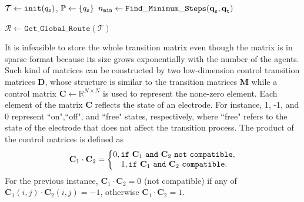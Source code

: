 \documentclass[conference, onecolumn]{IEEEtran}
\begin{document}
\begin{algorithm}[ht!]
	\caption {${{\tt GRTM}}$}
	\label{globalroute}
	\DontPrintSemicolon
	\SetAlgoVlined
	\BlankLine	
	$\mathcal{T}  \gets \mathtt{init}(q_{\tt s}) $,	$\mathbb{P}  \gets \{q_{\tt s}\} $\;
	$n_{\tt min} \gets \mathtt{Find\_Minimum\_Steps}(\textbf{q}_{\tt s},\textbf{q}_{\tt t}) $\;	
	
	$\mathcal{R} \gets \mathtt{Get\_Global\_Route}(\mathcal{T})$	
\end{algorithm}



It is infeasible to store the whole transition matrix even though the matrix is in sparse format because its size grows exponentially with the number of the agents. Such kind of matrices can be constructed by two low-dimension control transition matrices $\textbf{D}$, whose structure is similar to the transition matrices $\textbf{M}$ while a control matrix $\textbf{C} \gets \mathbb{R}^{N \times N}$ is used to represent the none-zero element. Each element of the matrix $\textbf{C}$ reflects the state of an electrode. For instance, 1, -1, and 0 represent ``on",``off", and ``free" states, respectively, where ``free" refers to the state of the electrode that does not affect the transition process. The product of the control matrices is defined as
\begin{equation}
	{\textbf{C}_1 \cdot \textbf{C}_2 } = \left\{\begin{matrix}
		0, {\tt if \ } \textbf{C}_1 {\tt \ and\ } \textbf{C}_2 {\tt\  not\ compatible}, \\1, {\tt if \ } \textbf{C}_1 {\tt \ and\ } \textbf{C}_2 {\tt\  compatible}.
	\end{matrix}\right.
	\label{controltransitiondot}
\end{equation}
For the previous instance, $\textbf{C}_1 \cdot \textbf{C}_2 = 0$  (not compatible) if any of $\textbf{C}_1(i,j) \cdot \textbf{C}_2(i,j) =-1$, otherwise $\textbf{C}_1 \cdot \textbf{C}_2 = 1$. 
\end{document}
